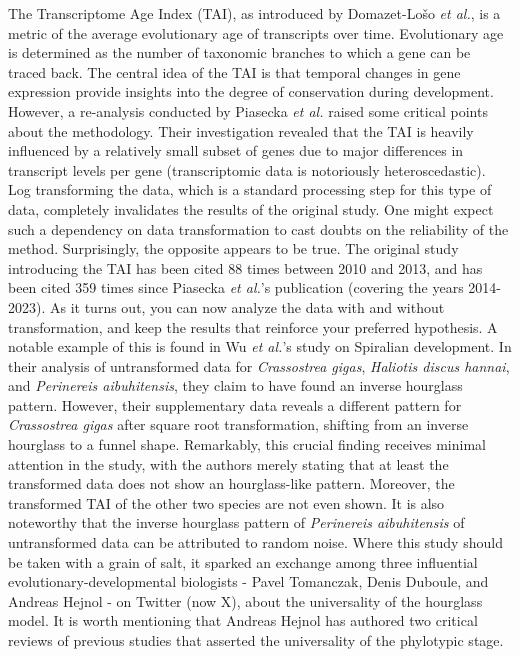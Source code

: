 The Transcriptome Age Index (TAI), as introduced by Domazet-Lošo \textit{et al.}, is a metric of the average evolutionary age of transcripts over time\cite{DomazetLoso2010}. Evolutionary age is determined as the number of taxonomic branches to which a gene can be traced back. The central idea of the TAI is that temporal changes in gene expression provide insights into the degree of conservation during development. However, a re-analysis conducted by Piasecka \textit{et al.} raised some critical points about the methodology\cite{Piasecka2013}. Their investigation revealed that the TAI is heavily influenced by a relatively small subset of genes due to major differences in transcript levels per gene (transcriptomic data is notoriously heteroscedastic). Log transforming the data, which is a standard processing step for this type of data, completely invalidates the results of the original study. One might expect such a dependency on data transformation to cast doubts on the reliability of the method. Surprisingly, the opposite appears to be true. The original study introducing the TAI has been cited 88 times between 2010 and 2013, and has been cited 359 times since Piasecka \textit{et al.}'s publication (covering the years 2014-2023). As it turns out, you can now analyze the data with and without transformation, and keep the results that reinforce your preferred hypothesis. A notable example of this is found in Wu \textit{et al.}'s study on Spiralian development\cite{Wu2019}. In their analysis of untransformed data for \textit{Crassostrea gigas}, \textit{Haliotis discus hannai}, and \textit{Perinereis aibuhitensis}, they claim to have found an inverse hourglass pattern. However, their supplementary data reveals a different pattern for \textit{Crassostrea gigas} after square root transformation, shifting from an inverse hourglass to a funnel shape. Remarkably, this crucial finding receives minimal attention in the study, with the authors merely stating that at least the transformed data does not show an hourglass-like pattern. Moreover, the transformed TAI of the other two species are not even shown. It is also noteworthy that the inverse hourglass pattern of \textit{Perinereis aibuhitensis} of untransformed data can be attributed to random noise. Where this study should be taken with a grain of salt, it sparked an exchange among three influential evolutionary-developmental biologists - Pavel Tomanczak, Denis Duboule, and Andreas Hejnol - on Twitter (now X), about the universality of the hourglass model\cite{hejnoltwitter}. It is worth mentioning that Andreas Hejnol has authored two critical reviews of previous studies that asserted the universality of the phylotypic stage\cite{Dunn2018,hejnol2016}.

